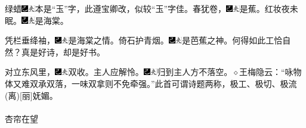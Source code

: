 绿蜡{\includegraphics[width=3mm]{../Images/00003}\includegraphics[width=3mm]{../Images/00012}\footnotesize \kaishu 本是“玉”字，此遵宝卿改，似较“玉”字佳。}春犹卷，{\includegraphics[width=3mm]{../Images/00003}\includegraphics[width=3mm]{../Images/00012}\footnotesize \kaishu 是蕉。}红妆夜未眠。{\includegraphics[width=3mm]{../Images/00003}\includegraphics[width=3mm]{../Images/00012}\footnotesize \kaishu 是海棠。}

凭栏垂绛袖，{\includegraphics[width=3mm]{../Images/00003}\includegraphics[width=3mm]{../Images/00012}\footnotesize \kaishu 是海棠之情。}倚石护青烟。{\includegraphics[width=3mm]{../Images/00003}\includegraphics[width=3mm]{../Images/00012}\footnotesize \kaishu 是芭蕉之神。何得如此工恰自然？真是好诗，却是好书。}

对立东风里，{\includegraphics[width=3mm]{../Images/00003}\includegraphics[width=3mm]{../Images/00012}\footnotesize \kaishu 双收。}主人应解怜。{\includegraphics[width=3mm]{../Images/00003}\includegraphics[width=3mm]{../Images/00012}\footnotesize \kaishu 归到主人方不落空。{$\diamond$}王梅隐云：“咏物体又难双承双落，一味双拿则不免牵强。”此首可谓诗题两称，极工、极切、极流{(离)}{[}丽{]}妩媚。}
\\
\\
\indent
杏帘在望

